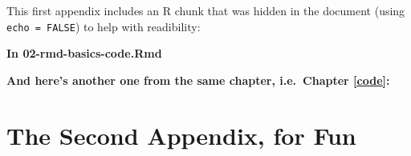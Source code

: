 \documentclass[a4paper, nobind]{templates/ociamthesis}
\newcommand*{\bibtitle}{Works Cited}
\begin{document}
This first appendix includes an R chunk that was hidden in the document (using \texttt{echo\ =\ FALSE}) to help with readibility:

\textbf{In 02-rmd-basics-code.Rmd}

\textbf{And here's another one from the same chapter, i.e.~Chapter \ref{code}:}

\hypertarget{the-second-appendix-for-fun}{%
\chapter{The Second Appendix, for Fun}\label{the-second-appendix-for-fun}}


\setlength{\baselineskip}{0pt} %

{\renewcommand*\MakeUppercase[1]{#1}%
\printbibliography[heading=bibintoc,title={\bibtitle}]}
\end{document}
